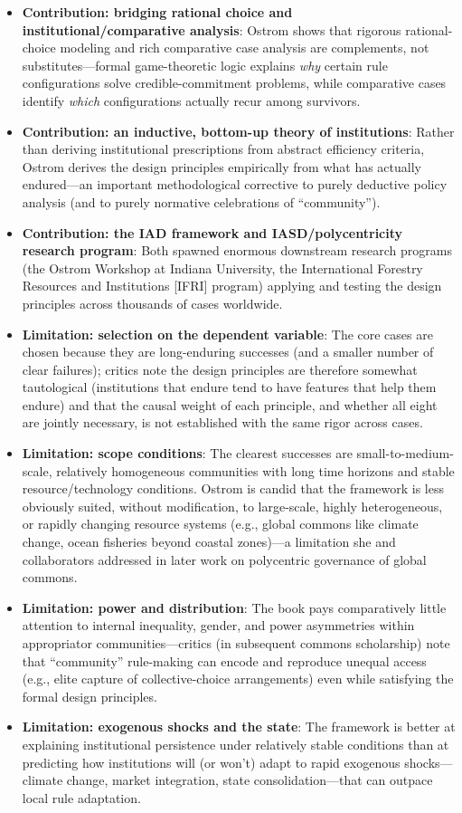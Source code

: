 \documentclass[12pt]{article}
\begin{document}
\begin{itemize}[leftmargin=*, itemsep=4pt]
    \item \textbf{Contribution: bridging rational choice and institutional/comparative analysis}: Ostrom shows that rigorous rational-choice modeling and rich comparative case analysis are complements, not substitutes---formal game-theoretic logic explains \emph{why} certain rule configurations solve credible-commitment problems, while comparative cases identify \emph{which} configurations actually recur among survivors.
    \item \textbf{Contribution: an inductive, bottom-up theory of institutions}: Rather than deriving institutional prescriptions from abstract efficiency criteria, Ostrom derives the design principles empirically from what has actually endured---an important methodological corrective to purely deductive policy analysis (and to purely normative celebrations of ``community'').
    \item \textbf{Contribution: the IAD framework and IASD/polycentricity research program}: Both spawned enormous downstream research programs (the Ostrom Workshop at Indiana University, the International Forestry Resources and Institutions [IFRI] program) applying and testing the design principles across thousands of cases worldwide.
    \item \textbf{Limitation: selection on the dependent variable}: The core cases are chosen because they are long-enduring successes (and a smaller number of clear failures); critics note the design principles are therefore somewhat tautological (institutions that endure tend to have features that help them endure) and that the causal weight of each principle, and whether all eight are jointly necessary, is not established with the same rigor across cases.
    \item \textbf{Limitation: scope conditions}: The clearest successes are small-to-medium-scale, relatively homogeneous communities with long time horizons and stable resource/technology conditions. Ostrom is candid that the framework is less obviously suited, without modification, to large-scale, highly heterogeneous, or rapidly changing resource systems (e.g., global commons like climate change, ocean fisheries beyond coastal zones)---a limitation she and collaborators addressed in later work on polycentric governance of global commons.
    \item \textbf{Limitation: power and distribution}: The book pays comparatively little attention to internal inequality, gender, and power asymmetries within appropriator communities---critics (in subsequent commons scholarship) note that ``community'' rule-making can encode and reproduce unequal access (e.g., elite capture of collective-choice arrangements) even while satisfying the formal design principles.
    \item \textbf{Limitation: exogenous shocks and the state}: The framework is better at explaining institutional persistence under relatively stable conditions than at predicting how institutions will (or won't) adapt to rapid exogenous shocks---climate change, market integration, state consolidation---that can outpace local rule adaptation.
\end{itemize}
\end{document}

